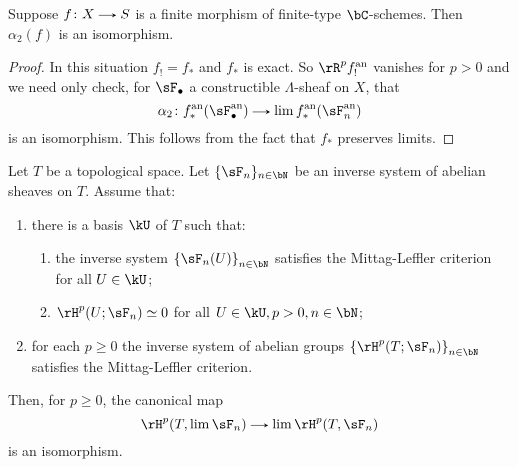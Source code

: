 \begin{nothing}
  \begin{sublemma}
    \label{comp-a2-finite}
    Suppose $f \c X \to S$ is a finite morphism of finite-type $\bC$-schemes. Then $\alpha_2(f)$ is an isomorphism.

    \begin{proof}
      In this situation $f_! = f_*$ and $f_*$ is exact. So $\rR^p f^\an_!$ vanishes for $p > 0$ and we need only check, for $\sF_\bullet$ a constructible $\Lambda$-sheaf on $X$, that
      \[
        \alpha_2 \c f^\an_*(\sF_\bullet^\an) \to \lim f^\an_*(\sF_n^\an)
      \]
      is an isomorphism. This follows from the fact that $f_*$ preserves limits.
    \end{proof}
  \end{sublemma}
  
  \begin{sublemma}
    \label{comp-a2-lim}
    Let $T$ be a topological space. Let $\{\sF_n\}_{n \in \bN}$ be an inverse system of abelian sheaves on $T$. Assume that:
    \begin{enumerate}
    \item \label{comp-a2-lim-basis}
      there is a basis $\kU$ of $T$ such that:
      \begin{enumerate}
      \item the inverse system $\l\{\sF_n(U)\r\}_{n \in \bN}$ satisfies the Mittag-Leffler criterion for all $U \in \kU$;
      \item $\rH^p(U;\sF_n) \iso 0$ for all $U \in \kU, p > 0, n \in \bN$;
      \end{enumerate}
    \item \label{comp-a2-lim-ML}
      for each $p \ge 0$ the inverse system of abelian groups $\l\{\rH^p(T;\sF_n)\r\}_{n \in \bN}$ satisfies the Mittag-Leffler criterion.
    \end{enumerate}
    Then, for $p \ge 0$, the canonical map
    \[
      \rH^p(T,\lim \sF_n) \to \lim {\rH^p(T,\sF_n)}
    \]
    is an isomorphism.


\end{sublemma}
\end{nothing}
